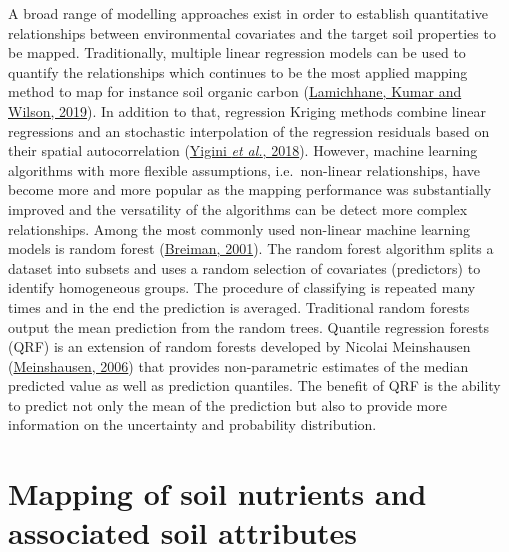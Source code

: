 \documentclass[
  10pt,
  b5paper,
  oneside]{book}
\begin{document}
A broad range of modelling approaches exist in order to establish quantitative relationships between environmental covariates and the target soil properties to be mapped.
Traditionally, multiple linear regression models can be used to quantify the relationships which continues to be the most applied mapping method to map for instance soil organic carbon (\protect\hyperlink{ref-lamichhane2019}{Lamichhane, Kumar and Wilson, 2019}). In addition to that, regression Kriging methods combine linear regressions and an stochastic interpolation of the regression residuals based on their spatial autocorrelation (\protect\hyperlink{ref-yigini2018}{Yigini \emph{et al.}, 2018}).
However, machine learning algorithms with more flexible assumptions, i.e.~non-linear relationships, have become more and more popular as the mapping performance was substantially improved and the versatility of the algorithms can be detect more complex relationships.
Among the most commonly used non-linear machine learning models is random forest (\protect\hyperlink{ref-Breiman2001}{Breiman, 2001}). The random forest algorithm splits a dataset into subsets and uses a random selection of covariates (predictors) to identify homogeneous groups. The procedure of classifying is repeated many times and in the end the prediction is averaged. Traditional random forests output the mean prediction from the random trees. Quantile regression forests (QRF) is an extension of random forests developed by Nicolai Meinshausen (\protect\hyperlink{ref-Meinshausen2006}{Meinshausen, 2006}) that provides non-parametric estimates of the median predicted value as well as prediction quantiles. The benefit of QRF is the ability to predict not only the mean of the prediction but also to provide more information on the uncertainty and probability distribution.

\hypertarget{mapping-of-soil-nutrients-and-associated-soil-attributes}{%
\section{Mapping of soil nutrients and associated soil attributes}\label{mapping-of-soil-nutrients-and-associated-soil-attributes}}
\end{document}
